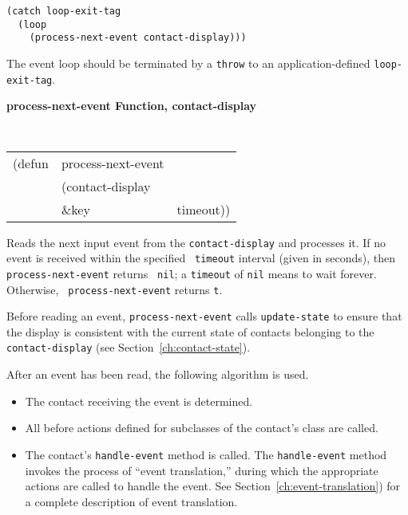 \documentclass[twoside]{book}
\begin{document}
\begin{sloppy}
\begin{verbatim}
(catch loop-exit-tag 
  (loop 
    (process-next-event contact-display)))
\end{verbatim}

The event loop should be terminated by a {\tt throw} to an application-defined 
{\tt loop-exit-tag}.


{\large {\bf process-next-event \hfill Function, contact-display}}
\begin{flushright} \parbox[t]{6.125in}{
\tt
\begin{tabular}{lll}
\raggedright
(defun & process-next-event & \\
& (contact-display\\
& \&key & timeout))
\end{tabular}
\rm

}\end{flushright}

\begin{flushright} \parbox[t]{6.125in}{
Reads the next input event  from the {\tt contact-display} and processes it. If no
event is received within the specified {\tt
timeout} interval (given in seconds), then {\tt process-next-event} returns {\tt
nil}; a {\tt timeout} of {\tt nil} means to wait forever. Otherwise, {\tt
process-next-event} returns {\tt t}.

Before reading an event, {\tt process-next-event} calls {\tt update-state} to
ensure that the display is consistent with the current state of contacts
belonging to the {\tt contact-display} (see Section~\ref{ch:contact-state}).

After an event has been read, the following algorithm is used.
\begin{itemize}
\item  The contact receiving the event is determined.
\item  All  before actions defined
for subclasses of the contact's class are called. 
\item The contact's {\tt handle-event}
method is called. The {\tt handle-event} method invokes the process of
``event translation,''
during which the appropriate actions are called to handle the event. See
Section~\ref{ch:event-translation}) for a complete description of event translation.
\end{itemize} }\end{flushright}



\end{sloppy}
\end{document}
